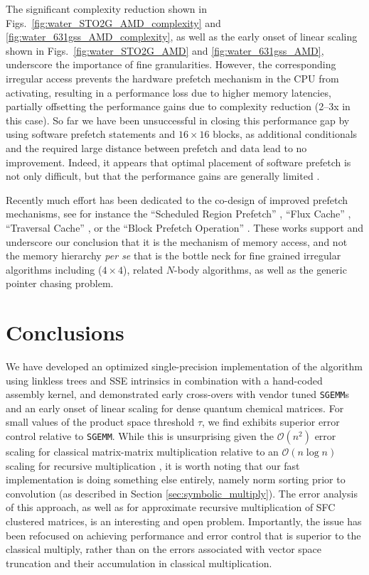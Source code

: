 The significant complexity reduction shown in
Figs.~\ref{fig:water_STO2G_AMD_complexity} and
\ref{fig:water_631gss_AMD_complexity}, as well as the early onset of linear
scaling shown in Figs.~\ref{fig:water_STO2G_AMD} and
\ref{fig:water_631gss_AMD}, underscore the importance of fine granularities.
However, the corresponding irregular access prevents the hardware prefetch
mechanism in the CPU from activating, resulting in a performance loss due to
higher memory latencies, partially offsetting the performance gains due to
complexity reduction (2--3x in this case). So far we have been unsuccessful in
closing this performance gap by using software prefetch statements and $16
\times 16$ blocks, as additional conditionals and the required large distance
between prefetch and data lead to no improvement.  Indeed, it appears that
optimal placement of software prefetch is not only difficult, but that the
performance gains are generally limited \cite{chilimbi2000making,
yang2000push, badawy2004efficacy, huang2009performance}.

Recently much effort has been dedicated to the co-design of improved prefetch
mechanisms, see for instance the ``Scheduled Region Prefetch''
\cite{lin2001reducing, wang2003guided}, ``Flux Cache''
\cite{gaydadjiev2006sad}, ``Traversal Cache'' \cite{stitt2008traversal}, or
the ``Block Prefetch Operation'' \cite{karlsson2000prefetching}.  These works
support and underscore our conclusion that it is the mechanism of memory
access, and not the memory hierarchy \emph{per se} that is the bottle neck for
fine grained irregular algorithms including \SpAMM{}($4 \times 4$), related
$N$-body algorithms, as well as the generic pointer chasing problem.

\section{Conclusions}
\label{sec:conclusions}

We have developed an optimized single-precision implementation of the \SpAMM{}
algorithm using linkless trees and SSE intrinsics in combination with a
hand-coded assembly kernel, and demonstrated early cross-overs with vendor
tuned {\tt SGEMM}s and an early onset of linear scaling for dense quantum
chemical matrices.  For small values of the product space threshold $\tau$, we
find \SpAMM{} exhibits superior error control relative to {\tt SGEMM}.  While
this is unsurprising given the $\mathcal{O} \left( n^{2} \right)$ error
scaling for classical matrix-matrix multiplication relative to an $\mathcal{O}
\left(n \log n \right)$ scaling for recursive multiplication
\cite{Bini:1980:FastMM}, it is worth noting that our fast implementation is
doing something else entirely, namely norm sorting prior to convolution (as
described in Section \ref{sec:symbolic_multiply}). The error analysis of this
approach, as well as for approximate recursive multiplication of SFC clustered
matrices, is an interesting and open problem.  Importantly, the issue has been
refocused on achieving performance and error control that is superior to the
classical multiply, rather than on the errors associated with vector space
truncation and their accumulation in classical multiplication.

